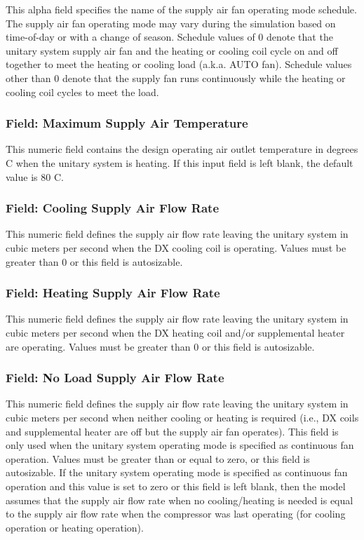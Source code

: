 This alpha field specifies the name of the supply air fan operating mode schedule. The supply air fan operating mode may vary during the simulation based on time-of-day or with a change of season. Schedule values of 0 denote that the unitary system supply air fan and the heating or cooling coil cycle on and off together to meet the heating or cooling load (a.k.a. AUTO fan). Schedule values other than 0 denote that the supply fan runs continuously while the heating or cooling coil cycles to meet the load.

\subsubsection{Field: Maximum Supply Air Temperature}\label{field-maximum-supply-air-temperature-2-000}

This numeric field contains the design operating air outlet temperature in degrees C when the unitary system is heating. If this input field is left blank, the default value is 80 C.

\subsubsection{Field: Cooling Supply Air Flow Rate}\label{field-cooling-supply-air-flow-rate-2-000}

This numeric field defines the supply air flow rate leaving the unitary system in cubic meters per second when the DX cooling coil is operating. Values must be greater than 0 or this field is autosizable.

\subsubsection{Field: Heating Supply Air Flow Rate}\label{field-heating-supply-air-flow-rate-2-000}

This numeric field defines the supply air flow rate leaving the unitary system in cubic meters per second when the DX heating coil and/or supplemental heater are operating. Values must be greater than 0 or this field is autosizable.

\subsubsection{Field: No Load Supply Air Flow Rate}\label{field-no-load-supply-air-flow-rate-2-000}

This numeric field defines the supply air flow rate leaving the unitary system in cubic meters per second when neither cooling or heating is required (i.e., DX coils and supplemental heater are off but the supply air fan operates). This field is only used when the unitary system operating mode is specified as continuous fan operation. Values must be greater than or equal to zero, or this field is autosizable. If the unitary system operating mode is specified as continuous fan operation and this value is set to zero or this field is left blank, then the model assumes that the supply air flow rate when no cooling/heating is needed is equal to the supply air flow rate when the compressor was last operating (for cooling operation or heating operation).

